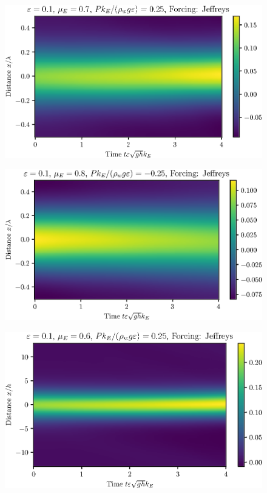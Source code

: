 \documentclass{jfm}
\begin{document}
\begin{figure}
  \centering
  \includegraphics{Spacetime-Mesh_double_mu.eps}
  \caption{}
\end{figure}

\begin{figure}
  \centering
  \includegraphics{Spacetime-Mesh_neg.eps}
  \caption{}
\end{figure}

\begin{figure}
  \centering
  \includegraphics{Spacetime-Mesh_solitary.eps}
  \caption{}
\end{figure}
\end{document}
